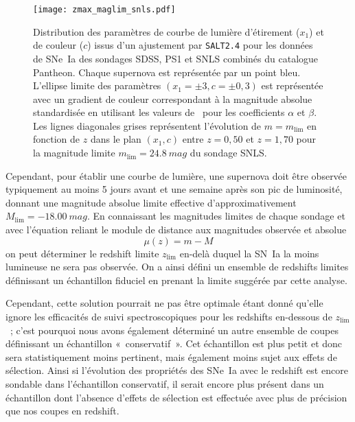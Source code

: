 \documentclass[../main/main.tex]{subfiles}
\begin{document}
\begin{figure}
    \centering
    \texttt{[image: zmax\_maglim\_snls.pdf]}
    \caption[Distribution et limite des paramètres de courbe de lumière
    d'étirement ($x_1$) et de couleur ($c$) des sondages SDSS, PS1 et SNLS
    combinés du catalogue Pantheon.]{Distribution des paramètres de courbe de
        lumière d'étirement ($x_1$) et de couleur ($c$) issus d'un ajustement
        par \texttt{SALT2.4} pour les données de SNe~Ia des sondages SDSS, PS1 et
        SNLS combinés du catalogue Pantheon. Chaque supernova est représentée par un
        point bleu. L'ellipse limite des paramètres $(x_1=\pm3, c=\pm0,3)$ est
        représentée avec un gradient de couleur correspondant à la magnitude
        absolue standardisée en utilisant les valeurs de~\cite{scolnic2018} pour
        les coefficients $\alpha$ et $\beta$. Les lignes diagonales grises
        représentent l'évolution de $m = m_{\lim}$ en fonction de $z$ dans le
        plan $(x_1,c)$ entre $z=0,50$ et $z=1,70$ pour la magnitude limite
    $m_{\lim}=\SI{24,8}{mag}$ du sondage SNLS.}
    \label{fig:maglim}
\end{figure}

Cependant, pour établir une courbe de lumière, une supernova doit être observée
typiquement au moins 5 jours avant et une semaine après son pic de luminosité,
donnant une magnitude absolue limite effective d'approximativement $M_{\lim}
= \SI{-18,00}{mag}$. En connaissant les magnitudes limites de chaque sondage et
avec l'équation reliant le module de distance aux magnitudes observée et
absolue
\begin{equation}\label{eq:distmod}
    \mu(z) = m - M
\end{equation}
on peut déterminer le redshift limite $z_{\lim}$ en-delà duquel la SN~Ia la
moins lumineuse ne sera pas observée. On a ainsi défini un ensemble de redshifts
limites définissant un échantillon fiduciel en prenant la limite suggérée par
cette analyse.

Cependant, cette solution pourrait ne pas être optimale étant donné qu'elle
ignore les efficacités de suivi spectroscopiques pour les redshifts en-dessous
de $z_{\lim}$~; c'est pourquoi nous avons également déterminé un autre ensemble
de coupes définissant un échantillon «~conservatif~». Cet échantillon est plus
petit et donc sera statistiquement moins pertinent, mais également moins sujet
aux effets de sélection. Ainsi si l'évolution des propriétés des SNe~Ia avec le
redshift est encore sondable dans l'échantillon conservatif, il serait encore
plus présent dans un échantillon dont l'absence d'effets de sélection est
effectuée avec plus de précision que nos coupes en redshift.
\end{document}
